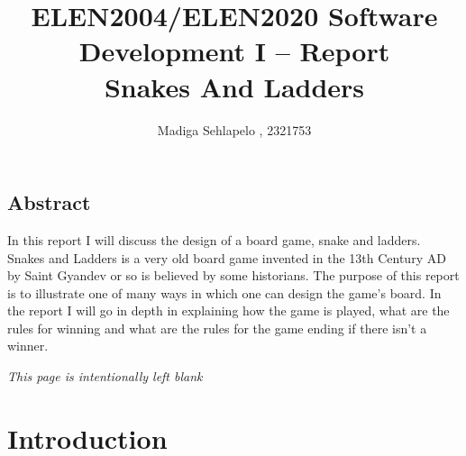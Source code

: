 


	
	
\title{ELEN2004/ELEN2020 Software Development I -- Report \\ Snakes And Ladders}

\author{Madiga Sehlapelo , 2321753}
\maketitle 
\pagestyle{fancy}
\fancyhf{}

\fancyhead[R]{\thepage}

\newpage

\vspace*{\fill}
\begin{center}
	\begin{minipage}{.8\textwidth}
		\section*{Abstract}
		In this report I will discuss the design of a board game, snake and ladders. Snakes and Ladders is a very old board game invented in the 13th Century AD  by Saint Gyandev or so is believed by some historians. The purpose of this report is to illustrate one of many ways in which one can design the game's board. In the report I will go in depth in explaining how the game is played, what are the rules for winning and what are the rules for the game ending if there isn't a winner.
	\end{minipage}
\end{center}
\vfill %


\newpage
\tableofcontents
\newpage
 
\begin{center}
	\textit{This page is intentionally left blank}
\end{center}


\newpage
\section*{Introduction}
